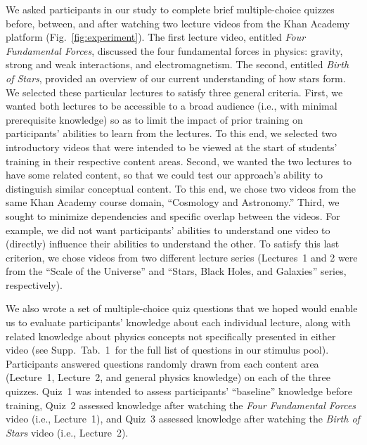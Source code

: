 \documentclass[10pt]{article}
\newcommand{\questions}{1}
\begin{document}
We asked participants in our study to complete brief multiple-choice quizzes
before, between, and after watching two lecture videos from the Khan
Academy~\citep{Khan04} platform (Fig.~\ref{fig:experiment}). The first lecture
video, entitled \textit{Four Fundamental Forces}, discussed the four
fundamental forces in physics: gravity, strong and weak interactions, and
electromagnetism. The second, entitled \textit{Birth of Stars}, provided an
overview of our current understanding of how stars form. We selected these
particular lectures to satisfy three general criteria. First, we wanted both
lectures to be accessible to a broad audience (i.e., with minimal prerequisite
knowledge) so as to limit the impact of prior training on participants'
abilities to learn from the lectures. To this end, we selected two introductory
videos that were intended to be viewed at the start of students' training in
their respective content areas. Second, we wanted the two lectures to have some
related content, so that we could test our approach's ability to distinguish
similar conceptual content. To this end, we chose two videos from the same Khan
Academy course domain, ``Cosmology and Astronomy.'' Third, we sought to
minimize dependencies and specific overlap between the videos. For example, we
did not want participants' abilities to understand one video to (directly)
influence their abilities to understand the other. To satisfy this last
criterion, we chose videos from two different lecture series (Lectures~1 and 2
were from the ``Scale of the Universe'' and ``Stars, Black Holes, and
Galaxies'' series, respectively).

We also wrote a set of multiple-choice quiz questions that we hoped would
enable us to evaluate participants' knowledge about each individual lecture,
along with related knowledge about physics concepts not specifically presented
in either video (see Supp.~Tab.~\questions~for the full list of questions in
our stimulus pool). Participants answered questions randomly drawn from each
content area (Lecture~1, Lecture~2, and general physics knowledge) on each of
the three quizzes. Quiz~1 was intended to assess participants' ``baseline''
knowledge before training, Quiz~2 assessed knowledge after watching the
\textit{Four Fundamental Forces} video (i.e., Lecture~1), and Quiz~3 assessed
knowledge after watching the \textit{Birth of Stars} video (i.e., Lecture~2).
\end{document}
